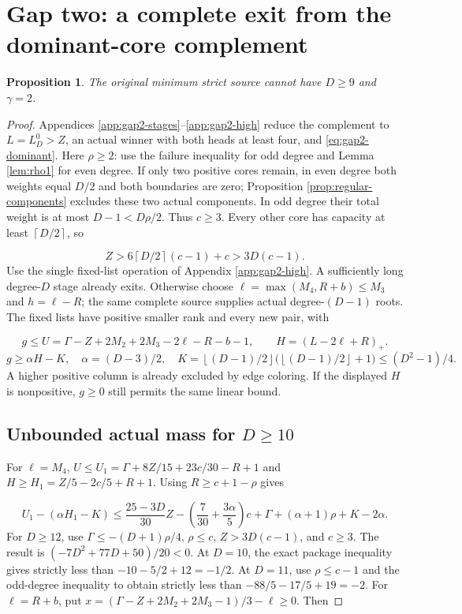 \documentclass[11pt,a4paper]{article}
\newcommand{\floor}[1]{\left\lfloor#1\right\rfloor}
\newcommand{\ceil}[1]{\left\lceil#1\right\rceil}
\newtheorem{proposition}[theorem]{Proposition}
\theoremstyle{definition}
\begin{document}
\section{Gap two: a complete exit from the dominant-core complement}\label{app:gap2-dominant}
\begin{proposition}\label{prop:gap2}
The original minimum strict source cannot have $D\ge9$ and $\gamma=2$.
\end{proposition}
\begin{proof}
Appendices \ref{app:gap2-stages}--\ref{app:gap2-high} reduce the complement to
$L=L_D^0>Z$, an actual winner with both heads at least four,
and \eqref{eq:gap2-dominant}.
Here $\rho\ge2$: use the failure inequality for odd degree
and Lemma \ref{lem:rho1} for even degree.
If only two positive cores remain, in even degree both weights equal $D/2$
and both boundaries are zero; Proposition \ref{prop:regular-components}
excludes these two actual components.
In odd degree their total weight is at most $D-1<D\rho/2$.
Thus $c\ge3$.
Every other core has capacity at least $\ceil{D/2}$, so

\[
Z>6\ceil{D/2}(c-1)+c>3D(c-1).
\]
Use the single fixed-list operation of Appendix \ref{app:gap2-high}.
A sufficiently long degree-$D$ stage already exits.
Otherwise choose $\ell=\max(M_4,R+b)\le M_3$ and $h=\ell-R$;
the same complete source supplies actual degree-$(D-1)$ roots.
The fixed lists have positive smaller rank and every new pair, with

\[
g\le U=\Gamma-Z+2M_2+2M_3-2\ell-R-b-1,\qquad
H=(L-2\ell+R)_+.
\]
\[
g\ge\alpha H-K,\quad
\alpha=(D-3)/2,\quad
K=\floor{(D-1)/2}\bigl(\floor{(D-1)/2}+1\bigr)\le(D^2-1)/4.
\]
A higher positive column is already excluded by edge coloring.
If the displayed $H$ is nonpositive, $g\ge0$ still permits the same linear bound.

\subsection*{Unbounded actual mass for $D\ge10$}
For $\ell=M_4$,
$U\le U_1=\Gamma+8Z/15+23c/30-R+1$ and
$H\ge H_1=Z/5-2c/5+R+1$.
Using $R\ge c+1-\rho$ gives

\[
U_1-(\alpha H_1-K)
\le\frac{25-3D}{30}Z-
\left(\frac7{30}+\frac{3\alpha}{5}\right)c
+\Gamma+(\alpha+1)\rho+K-2\alpha.
\]
For $D\ge12$, use $\Gamma\le-(D+1)\rho/4$, $\rho\le c$,
$Z>3D(c-1)$, and $c\ge3$.
The result is $(-7D^2+77D+50)/20<0$.
At $D=10$, the exact package inequality gives strictly less than $-10-5/2+12=-1/2$.
At $D=11$, use $\rho\le c-1$ and the odd-degree inequality
to obtain strictly less than $-88/5-17/5+19=-2$.
For $\ell=R+b$, put
$x=(\Gamma-Z+2M_2+2M_3-1)/3-\ell\ge0$. Then


\end{proof}
\end{document}
